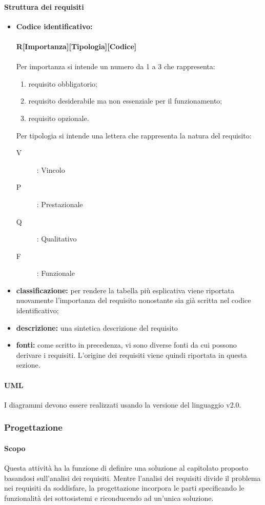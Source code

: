 \paragraph{Struttura dei requisiti}
\begin{itemize}
\item \textbf{Codice identificativo:} \\ \\
 		\textbf{R[Importanza][Tipologia][Codice]}\\ \\
Per importanza si intende un numero da 1 a 3 che rappresenta:
\begin{enumerate}
\item requisito obbligatorio;
\item requisito desiderabile ma non essenziale per il funzionamento;
\item requisito opzionale.
\end{enumerate}
Per tipologia si intende una lettera che rappresenta la natura del requisito:
\begin{description}
\item[V]: Vincolo
\item[P]: Prestazionale
\item[Q]: Qualitativo
\item[F]: Funzionale
\end{description}
\item \textbf{classificazione:} per rendere la tabella più esplicativa viene riportata nuovamente l'importanza del requisito nonostante sia già scritta nel codice identificativo;
\item \textbf{descrizione:} una sintetica descrizione del requisito
\item \textbf{fonti:} come scritto in precedenza, vi sono diverse fonti da cui possono derivare i requisiti. L'origine dei requisiti viene quindi riportata in questa sezione. 
\end{itemize}
\paragraph{UML}
I diagrammi  devono essere realizzati usando la versione del linguaggio v2.0.
\subsubsection{Progettazione}
\paragraph{Scopo}
Questa attività ha la funzione di definire una soluzione al capitolato proposto basandosi sull'analisi dei requisiti.
Mentre l'analisi dei requisiti divide il problema nei requisiti da soddisfare, la progettazione incorpora le parti specificando le funzionalità dei sottosistemi e riconducendo ad un'unica soluzione.
